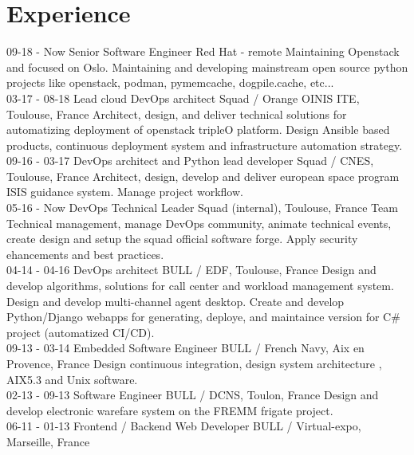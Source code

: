 \documentclass[]{friggeri-cv}
\begin{document}
\section{Experience}
\begin{entrylist}
    \entry
        {09-18 - Now}
        {Senior Software Engineer}
        {Red Hat - remote}
        {Maintaining Openstack and focused on Oslo. Maintaining and developing mainstream open source python projects like
        openstack, podman, pymemcache, dogpile.cache, etc...\\}
    \entry
        {03-17 - 08-18}
        {Lead cloud DevOps architect}
        {Squad / Orange OINIS ITE, Toulouse, France}
        {Architect, design, and deliver technical solutions for automatizing deployment of openstack tripleO platform.
        Design Ansible based products, continuous deployment system and infrastructure automation strategy.\\}
    \entry
        {09-16 - 03-17}
        {DevOps architect and Python lead developer}
        {Squad / CNES, Toulouse, France}
        {Architect, design, develop and deliver european space program ISIS guidance system. Manage project workflow.\\}
    \entry
        {05-16 - Now}
        {DevOps Technical Leader}
        {Squad (internal), Toulouse, France}
        {Team Technical management, manage DevOps community, animate technical events, 
        create design and setup the squad official software forge. Apply security ehancements and best practices.\\}
    \entry
        {04-14 - 04-16}
        {DevOps architect}
        {BULL / EDF, Toulouse, France}
        {Design and develop algorithms, solutions for call center and workload management system. Design and develop multi-channel agent desktop.
        Create and develop Python/Django webapps for generating, deploye, and maintaince version for C\# project (automatized CI/CD).\\}
    \entry
        {09-13 - 03-14}
        {Embedded Software Engineer}
        {BULL / French Navy, Aix en Provence, France}
        {Design continuous integration, design system architecture , AIX5.3 and Unix software.\\}
    \entry
        {02-13 - 09-13}
        {Software Engineer}
        {BULL / DCNS, Toulon, France}
        {Design and develop electronic warefare system on the FREMM frigate project.\\}
    \entry
        {06-11 - 01-13}
        {Frontend / Backend Web Developer}
        {BULL / Virtual-expo, Marseille, France}

\end{entrylist}
\end{document}
